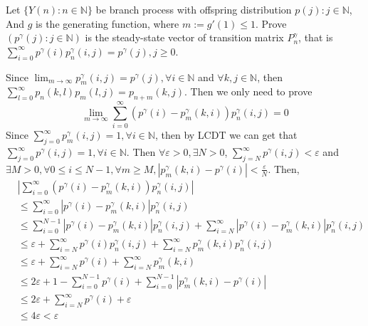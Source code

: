 \documentclass{ctexart}
\begin{document}
\begin{problem}\label{pro:5}
  Let \(\{Y(n): n \in \mathbb{N}\}\) be branch process with offspring distribution \(p(j): j \in \mathbb{N}\),
  And \(g\) is the generating function, where \(m :=g' (1) \leq 1\).
  Prove \((p^\gamma(j): j \in \mathbb{N})\) is the steady-state vector of
  transition matrix \(P_n^\gamma\), that is \(\sum_{i =0}^{\infty} p^\gamma(i)p_n^\gamma(i,j)=p^{\gamma}(j), j \geq 0\).
\end{problem}
\begin{solution}
  Since \(\lim_{m \to \infty}p_m^\gamma(i,j)=p^\gamma(j),\forall i \in \mathbb{N}\) and \(\forall k,j \in \mathbb{N}\), then
  \(\sum_{l=0}^{\infty} p_n(k,l)p_m(l,j)=p_{n + m}(k,j)\). Then we only need to prove \[
    \lim_{m \to \infty}\sum_{i=0}^{\infty} (p^\gamma(i)-p_m^\gamma(k,i))p_n^\gamma(i,j)=0
  \]
  Since \(\sum_{j=0}^\infty p_m^\gamma(i,j)=1, \forall i \in \mathbb{N}\), then by LCDT we can get that
  \(\sum_{j=0}^{\infty} p^\gamma(i,j)=1, \forall i \in \mathbb{N}\).
  Then \(\forall \varepsilon >0, \exists N>0\), \(\sum_{j=N}^{\infty} p^\gamma(i,j) <\varepsilon\) and
  \(\exists M >0, \forall 0 \leq i \leq N-1, \forall m \geq M, |p_m^\gamma(k,i)-p^\gamma(i)| < \frac{\varepsilon}{N}\).
  Then, \[
    \begin{aligned}
       & |\sum_{i=0}^{\infty} (p^\gamma(i)-p_m^\gamma(k,i))p_n^\gamma(i,j)|                                                                     \\
       & \leq \sum_{i=0}^{\infty} |p^\gamma(i)-p_m^\gamma(k,i)|p_n^\gamma(i,j)                                                                  \\
       & \leq \sum_{i=0}^{N-1} |p^\gamma(i)-p_m^\gamma(k,i)|p_n^\gamma(i,j) + \sum_{i=N}^{\infty}|p^\gamma(i)-p_m^{\gamma}(k,i)|p_n^\gamma(i,j) \\
       & \leq \varepsilon + \sum_{i=N}^{\infty} p^\gamma(i)p_n^\gamma(i,j) + \sum_{i=N}^{\infty} p_m^\gamma(k,i)p_n^\gamma(i,j)                 \\
       & \leq \varepsilon + \sum_{i=N}^{\infty} p^\gamma(i)+\sum_{i=N}^{\infty} p_m^\gamma(k,i)                                                 \\
       & \leq 2\varepsilon + 1-\sum_{i=0}^{N-1} p^\gamma(i)+\sum_{i=0}^{N-1} |p_m^\gamma(k,i)-p^\gamma(i)|                                      \\
       & \leq 2\varepsilon + \sum_{i=N}^{\infty} p^\gamma(i)+\varepsilon                                                                        \\
       & \leq 4\varepsilon < \varepsilon
    \end{aligned}
  \]
\end{solution}
\end{document}
